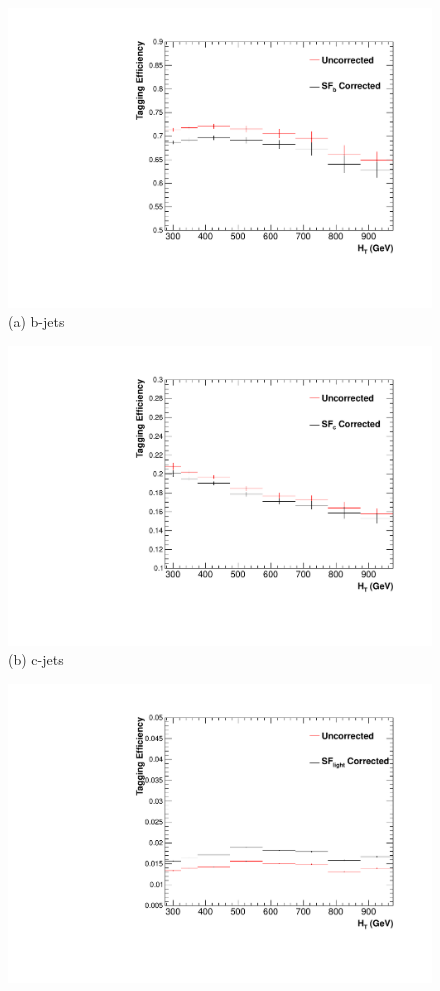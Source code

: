 \begin{figure}[ht]
\centering
\begin{minipage}[b]{0.38\linewidth}
\includegraphics[width = 1.0\linewidth]{plots/b_jet_HTDistribution.pdf}
\centering (a)  b-jets
\end{minipage}
\quad
\begin{minipage}[b]{0.38\linewidth}
\includegraphics[width = 1.0\linewidth]{plots/c_jet_HTDistribution.pdf}
\centering (b) c-jets
\end{minipage}
\quad
\begin{minipage}[b]{0.38\linewidth}
\centering
\includegraphics[width = 1.0\linewidth]{plots/light_jet_HTDistribution.pdf}

\end{minipage}
\end{figure}
